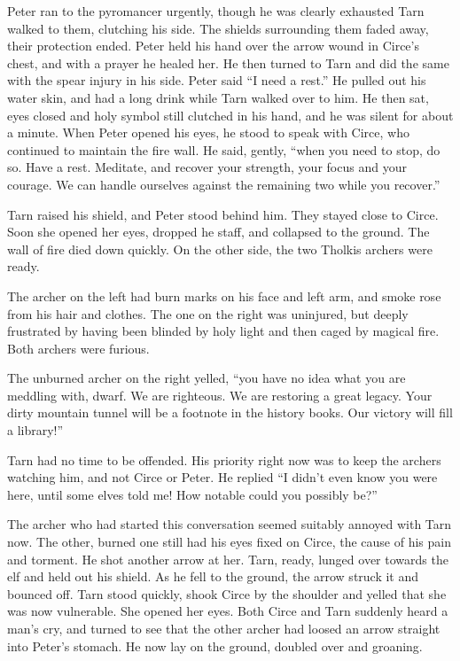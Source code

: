 Peter ran to the pyromancer urgently, though he was clearly exhausted  Tarn walked to them, clutching his side.  The shields surrounding them faded away, their protection ended.  Peter held his hand over the arrow wound in Circe's chest, and with a prayer he healed her.  He then turned to Tarn and did the same with the spear injury in his side.  Peter said ``I need a rest.''  He pulled out his water skin, and had a long drink while Tarn walked over to him.  He then sat, eyes closed and holy symbol still clutched in his hand, and he was silent for about a minute.  When Peter opened his eyes, he stood to speak with Circe, who continued to maintain the fire wall.  He said, gently, ``when you need to stop, do so.  Have a rest.  Meditate, and recover your strength, your focus and your courage.  We can handle ourselves against the remaining two while you recover.''

Tarn raised his shield, and Peter stood behind him.  They stayed close to Circe.  Soon she opened her eyes, dropped he staff, and collapsed to the ground.  The wall of fire died down quickly.  On the other side, the two Tholkis archers were ready.

The archer on the left had burn marks on his face and left arm, and smoke rose from his hair and clothes.  The one on the right was uninjured, but deeply frustrated by having been blinded by holy light and then caged by magical fire.  Both archers were furious.

The unburned archer on the right yelled, ``you have no idea what you are meddling with, dwarf.  We are righteous.  We are restoring a great legacy.  Your dirty mountain tunnel will be a footnote in the history books.  Our victory will fill a library!''

Tarn had no time to be offended.  His priority right now was to keep the archers watching him, and not Circe or Peter.  He replied ``I didn't even know you were here, until some elves told me!  How notable could you possibly be?''

The archer who had started this conversation seemed suitably annoyed with Tarn now.  The other, burned one still had his eyes fixed on Circe, the cause of his pain and torment.  He shot another arrow at her.  Tarn, ready, lunged over towards the elf and held out his shield.  As he fell to the ground, the arrow struck it and bounced off.  Tarn stood quickly, shook Circe by the shoulder and yelled that she was now vulnerable.  She opened her eyes.  Both Circe and Tarn suddenly heard a man's cry, and turned to see that the other archer had loosed an arrow straight into Peter's stomach.  He now lay on the ground, doubled over and groaning.

